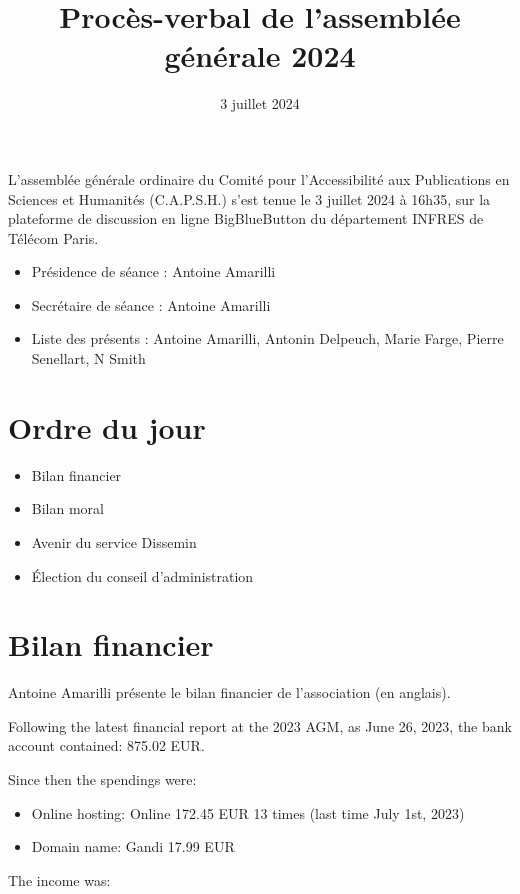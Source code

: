 \documentclass[a4paper]{article}
\title{Procès-verbal de l'assemblée générale 2024}
\date{3 juillet 2024}
\begin{document}
\maketitle

L'assemblée générale ordinaire du Comité pour l'Accessibilité aux Publications
en Sciences et Humanités (C.A.P.S.H.) s'est tenue le 3 juillet 2024 à 16h35,
sur la plateforme de discussion en ligne BigBlueButton du département INFRES de Télécom Paris.

\begin{itemize}
  \item Présidence de séance : Antoine Amarilli
  \item Secrétaire de séance : Antoine Amarilli
  \item Liste des présents : Antoine Amarilli, Antonin Delpeuch, Marie Farge,
    Pierre Senellart, N Smith
\end{itemize}

\section{Ordre du jour}

\begin{itemize}
\item Bilan financier
\item Bilan moral
\item Avenir du service Dissemin
\item Élection du conseil d'administration
\end{itemize}

\section{Bilan financier}

Antoine Amarilli présente le bilan financier de l'association (en anglais).

Following the latest financial report at the 2023 AGM, as June 26, 2023, the bank account contained: 875.02 EUR.

Since then the spendings were:

\begin{itemize}
  \item Online hosting: Online 172.45 EUR 13 times (last time July 1st, 2023)
  \item Domain name: Gandi 17.99 EUR
\end{itemize}

The income was:
\end{document}
